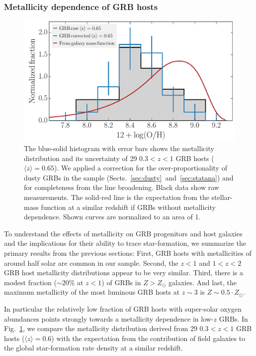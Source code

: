 \documentclass[traditabstract, longauth]{aa}
\begin{document}
\subsubsection{Metallicity dependence of GRB hosts}

\begin{figure}
\includegraphics[angle=0, width=0.99\columnwidth]{Figs/MetvsMass.pdf}
\caption{ {The blue-solid histogram with error bars shows the metallicity distribution and its uncertainty of 29 $0.3<z<1$ GRB hosts ($\langle z \rangle = 0.65$). We applied a correction for the over-proportionality of dusty GRBs in the sample (Sects.~\ref{sec:dusty}~and~\ref{sec:statana}) and for completeness from the line broadening. Black data show raw measurements. The solid-red line is the expectation from the stellar-mass function at a similar redshift \citep{2013A&A...556A..55I, 2014ApJ...783...85T} if GRBs without metallicity dependence. Shown curves are normalized to an area of 1.}}
\label{fig:metvsmass}
\end{figure}

To understand the effects of metallicity on GRB progenitors and host galaxies and the implications for their ability to trace star-formation, we summarize the primary results from the previous sections: First, GRB hosts with metallicities of around half solar are common in our sample. Second, the $z<1$ and $1<z<2$ GRB host metallicity distributions appear to be very similar. Third, there is a modest fraction ($\sim 20\%$ at $z<1$) of GRBs in $Z > Z_{\odot}$ galaxies. And last, the maximum metallicity of the most luminous GRB hosts at $z\sim3$ is $Z\sim 0.5\cdot Z_{\odot}$.

{In particular the relatively low fraction of GRB hosts with super-solar oxygen abundances points strongly towards a metallicity dependence in low-$z$ GRBs.}  {In Fig.~\ref{fig:metvsmass}, we compare the metallicity distribution derived from 29 $0.3<z<1$ GRB hosts ($\langle z \rangle = 0.6$) with the expectation from the contribution of field galaxies to the global star-formation rate density at a similar redshift. }
\end{document}
